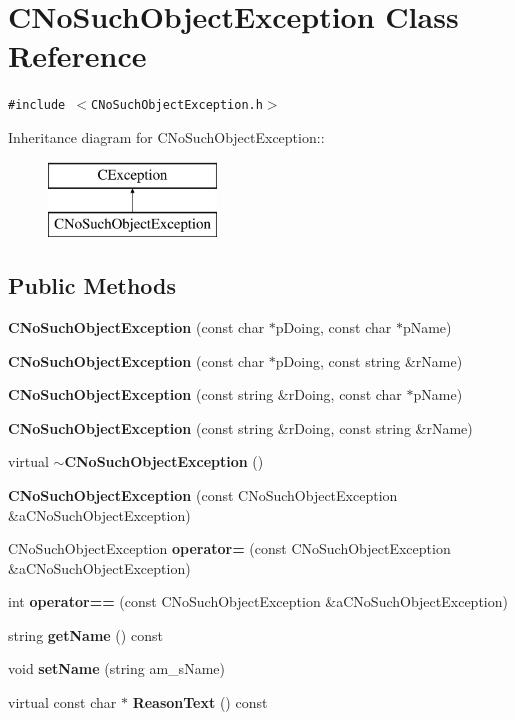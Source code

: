 \section{CNo\-Such\-Object\-Exception  Class Reference}
\label{classCNoSuchObjectException}
{\tt \#include $<$CNo\-Such\-Object\-Exception.h$>$}

Inheritance diagram for CNo\-Such\-Object\-Exception::\begin{figure}[H]
\begin{center}
\leavevmode
\includegraphics[height=2cm]{classCNoSuchObjectException}
\end{center}
\end{figure}
\subsection*{Public Methods}
\begin{CompactItemize}
\item 
{\bf CNo\-Such\-Object\-Exception} (const char $\ast$p\-Doing, const char $\ast$p\-Name)
\item 
{\bf CNo\-Such\-Object\-Exception} (const char $\ast$p\-Doing, const string \&r\-Name)
\item 
{\bf CNo\-Such\-Object\-Exception} (const string \&r\-Doing, const char $\ast$p\-Name)
\item 
{\bf CNo\-Such\-Object\-Exception} (const string \&r\-Doing, const string \&r\-Name)
\item 
virtual {\bf $\sim$CNo\-Such\-Object\-Exception} ()
\item 
{\bf CNo\-Such\-Object\-Exception} (const CNo\-Such\-Object\-Exception \&a\-CNo\-Such\-Object\-Exception)
\item 
CNo\-Such\-Object\-Exception {\bf operator=} (const CNo\-Such\-Object\-Exception \&a\-CNo\-Such\-Object\-Exception)
\item 
int {\bf operator==} (const CNo\-Such\-Object\-Exception \&a\-CNo\-Such\-Object\-Exception)
\item 
string {\bf get\-Name} () const
\item 
void {\bf set\-Name} (string am\_\-s\-Name)
\item 
virtual const char $\ast$ {\bf Reason\-Text} () const
\end{CompactItemize}

